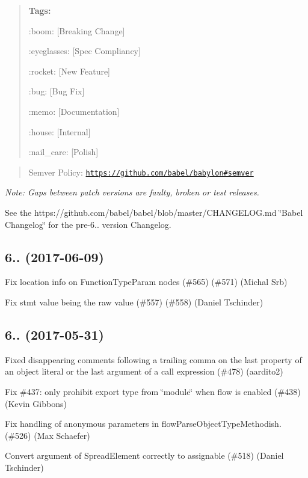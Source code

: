 \begin{quote}
{\bfseries Tags\+:}
\begin{DoxyItemize}
\item \+:boom\+: \mbox{[}Breaking Change\mbox{]}
\item \+:eyeglasses\+: \mbox{[}Spec Compliancy\mbox{]}
\item \+:rocket\+: \mbox{[}New Feature\mbox{]}
\item \+:bug\+: \mbox{[}Bug Fix\mbox{]}
\item \+:memo\+: \mbox{[}Documentation\mbox{]}
\item \+:house\+: \mbox{[}Internal\mbox{]}
\item \+:nail\+\_\+care\+: \mbox{[}Polish\mbox{]} 
\end{DoxyItemize}\end{quote}


\begin{quote}
Semver Policy\+: \href{https://github.com/babel/babylon#semver}{\tt https\+://github.\+com/babel/babylon\#semver} \end{quote}


{\itshape Note\+: Gaps between patch versions are faulty, broken or test releases.}

See the https\+://github.com/babel/babel/blob/master/\+C\+H\+A\+N\+G\+E\+L\+O\+G.\+md \char`\"{}\+Babel Changelog\char`\"{} for the pre-\/6.. version Changelog.

\subsection*{6.. (2017-\/06-\/09)}


\begin{DoxyItemize}
\item Fix location info on Function\+Type\+Param nodes (\#565) (\#571) (Michal Srb)
\item Fix stmt value being the raw value (\#557) (\#558) (Daniel Tschinder)
\end{DoxyItemize}

\subsection*{6.. (2017-\/05-\/31)}


\begin{DoxyItemize}
\item Fixed disappearing comments following a trailing comma on the last property of an object literal or the last argument of a call expression (\#478) (aardito2)
\item Fix \#437\+: only prohibit \textquotesingle{}export type from \char`\"{}module\char`\"{} \textquotesingle{} when flow is enabled (\#438) (Kevin Gibbons)
\item Fix handling of anonymous parameters in {\ttfamily flow\+Parse\+Object\+Type\+Methodish}. (\#526) (Max Schaefer)
\item Convert argument of Spread\+Element correctly to assignable (\#518) (Daniel Tschinder)
\end{DoxyItemize}

